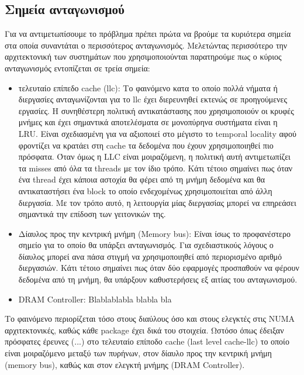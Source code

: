 \subsection{Σημεία ανταγωνισμού}
Για να αντιμετωπίσουμε το πρόβλημα πρέπει πρώτα να βρούμε τα κυριότερα σημεία
στα οποία συναντάται ο περισσότερος ανταγωνισμός. Μελετώντας περισσότερο την
αρχιτεκτονική των συστημάτων που χρησιμοποιούνται παρατηρούμε πως ο κύριος
ανταγωνισμός εντοπίζεται σε τρεία σημεία:
\begin{itemize}
	\item τελευταίο επίπεδο cache (llc): Το φαινόμενο κατα το οποίο πολλά
		νήματα ή διεργασίες ανταγωνίζονται για το llc έχει διερευνηθεί
		εκτενώς σε προηγούμενες εργασίες. Η συνηθέστερη πολιτική
		αντικατάστασης που χρησιμοποιούν οι κρυφές μνήμες και έχει
		σημαντικά αποτελέσματα σε μονοπύρηνα συστήματα είναι η LRU.
		Είναι σχεδιασμένη για να αξιοποιεί στο μέγιστο το temporal
		locality αφού φροντίζει να κρατάει στη cache τα δεδομένα που
		έχουν χρησιμοποιηθεί πιο πρόσφατα. Όταν όμως η LLC είναι
		μοιραζόμενη, η πολιτική αυτή αντιμετωπίζει τα misses από όλα τα
		threads με τον ίδιο τρόπο. Κάτι τέτοιο σημαίνει πως όταν ένα
		thread έχει κάποια αστοχία θα φέρει από τη μνήμη δεδομένα και θα
		αντικαταστήσει ένα block το οποίο ενδεχομένως χρησιμοποιείται
		από άλλη διεργασία. Με τον τρόπο αυτό, η λειτουργία μίας
		διεργασίας μπορεί να επηρεάσει σημαντικά την επίδοση των
		γειτονικών της.
	\item Δίαυλος προς την κεντρική μνήμη (Memory bus): Είναι ίσως το
		προφανέστερο σημείο για το οποίο θα υπάρξει ανταγωνισμός. Για
		σχεδιαστικούς λόγους ο δίαυλος μπορεί ανα πάσα στιγμή να
		χρησιμοποιηθεί από περιορισμένο αριθμό διεργασιών. Κάτι τέτοιο
		σημαίνει πως όταν δύο εφαρμογές προσπαθούν να φέρουν δεδομένα
		από τη μνήμη, θα υπάρξουν καθυστερήσεις εξ αιτίας του
		ανταγωνισμού.
	\item DRAM Controller: Blablablabla blabla bla
\end{itemize}

Το φαινόμενο περιορίζεται τόσο στους διαύλους όσο και στους ελεγκτές στις NUMA
αρχιτεκτονικές, καθώς κάθε package έχει δικά του στοιχεία. Ωστόσο όπως έδειξαν
πρόσφατες έρευνες (...) στο τελευταίο επίποδο cache (last level cache-llc) το
οποίο είναι μοιραζόμενο μεταξύ των πυρήνων, στον δίαυλο προς την κεντρική μνήμη
(memory bus), καθώς και στον ελεγκτή μνήμης (DRAM Controller).

